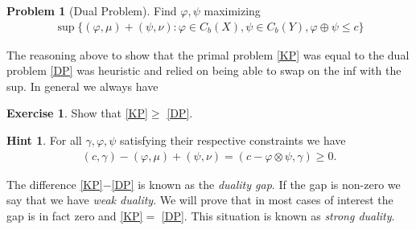 \documentclass[
    a4paper,
    DIV=14,
    abstract=true,
    numbers=noenddot
]
{scrartcl}
\theoremstyle{definition}
\newtheorem{problem}{Problem}
\newtheorem{exercise}{Exercise}
\newtheorem*{hint}{Hint}
\begin{document}
\begin{problem}[Dual Problem]\label{duality theorem}
Find $\varphi , \psi $ maximizing
\begin{align}\tag{DP}\label{DP}
    \sup \bigg\{ (\varphi ,\mu )+(\psi ,\nu): \varphi \in C_b(X), \psi \in C_b(Y), \varphi \oplus \psi \leq c \bigg\}
\end{align}
\end{problem}
The reasoning above to show that the primal problem \eqref{KP} was equal to the dual problem \eqref{DP} was heuristic and relied on being able to swap on the inf with the sup. In general we always have
\begin{exercise}\label{ex: weak duality}
    Show that \eqref{KP}$ \geq$ \eqref{DP}.
\end{exercise}
\begin{hint}
    For all $\gamma , \varphi , \psi $ satisfying their respective constraints we have
    \begin{align*}
        (c,\gamma )-(\varphi ,\mu )+(\psi ,\nu)= (c- \varphi \otimes \psi, \gamma ) \geq 0.
    \end{align*}
\end{hint}
The difference \eqref{KP}$-$\eqref{DP} is known as the \emph{duality gap}. If the gap is non-zero we say that we have \emph{weak duality}. We will prove that in most cases of interest the gap is in fact zero and  \eqref{KP}$ =$ \eqref{DP}. This situation is known as \emph{strong duality}.
\end{document}
